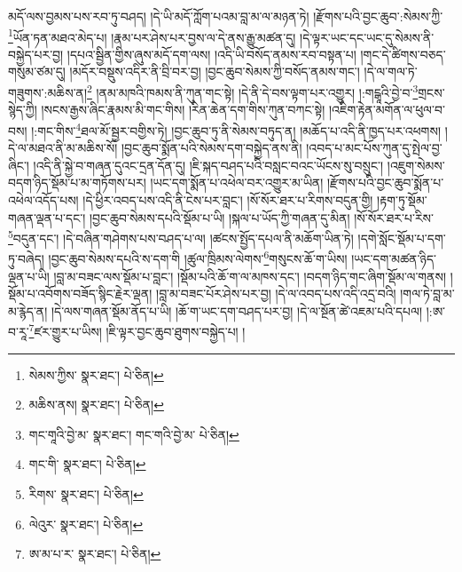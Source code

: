 མདོ་ལས་བྱམས་པས་རབ་ཏུ་བཤད། །དེ་ཡི་མདོ་ཀློག་པའམ་བླ་མ་ལ་མཉན་ཏེ། །རྫོགས་པའི་བྱང་ཆུབ་:སེམས་ཀྱི་\footnote{སེམས་ཀྱིས་  སྣར་ཐང་།  པེ་ཅིན། }ཡོན་ཏན་མཐའ་མེད་པ། །རྣམ་པར་ཤེས་པར་བྱས་ལ་དེ་ནས་རྒྱུ་མཚན་དུ། །དེ་ལྟར་ཡང་དང་ཡང་དུ་སེམས་ནི་བསྐྱེད་པར་བྱ། །དཔའ་སྦྱིན་གྱིས་ཞུས་མདོ་དག་ལས། །འདི་ཡི་བསོད་ནམས་རབ་བསྟན་པ། །གང་དེ་ཚིགས་བཅད་གསུམ་ཙམ་དུ། །མདོར་བསྡུས་འདིར་ནི་བྲི་བར་བྱ། །བྱང་ཆུབ་སེམས་ཀྱི་བསོད་ནམས་གང་། །དེ་ལ་གལ་ཏེ་གཟུགས་:མཆིས་ན།\footnote{མཆིས་ནས།  སྣར་ཐང་།  པེ་ཅིན། } །ནམ་མཁའི་ཁམས་ནི་ཀུན་གང་སྟེ། །དེ་ནི་དེ་བས་ལྟག་པར་འགྱུར། །:གངྒཱའི་བྱེ་བ་\footnote{གང་གཱའི་བྱེ་མ་  སྣར་ཐང་། གང་གའི་བྱེ་མ་  པེ་ཅིན། }གྲངས་སྙེད་ཀྱི། །སངས་རྒྱས་ཞིང་རྣམས་མི་གང་གིས། །རིན་ཆེན་དག་གིས་ཀུན་བཀང་སྟེ། །འཇིག་རྟེན་མགོན་ལ་ཕུལ་བ་བས། །:གང་གིས་\footnote{གང་གི་  སྣར་ཐང་།  པེ་ཅིན། }ཐལ་མོ་སྦྱར་བགྱིས་ཏེ། །བྱང་ཆུབ་ཏུ་ནི་སེམས་བཏུད་ན། །མཆོད་པ་འདི་ནི་ཁྱད་པར་འཕགས། །དེ་ལ་མཐའ་ནི་མ་མཆིས་སོ། །བྱང་ཆུབ་སྨོན་པའི་སེམས་དག་བསྐྱེད་ནས་ནི། །འབད་པ་མང་པོས་ཀུན་དུ་སྤེལ་བྱ་ཞིང་། །འདི་ནི་སྐྱེ་བ་གཞན་དུའང་དྲན་དོན་དུ། །ཇི་སྐད་བཤད་པའི་བསླང་བའང་ཡོངས་སུ་བསྲུང་། །འཇུག་སེམས་བདག་ཉིད་སྡོམ་པ་མ་གཏོགས་པར། །ཡང་དག་སྨོན་པ་འཕེལ་བར་འགྱུར་མ་ཡིན། །རྫོགས་པའི་བྱང་ཆུབ་སྨོན་པ་འཕེལ་འདོད་པས། །དེ་ཕྱིར་འབད་པས་འདི་ནི་ངེས་པར་བླང་། །སོ་སོར་ཐར་པ་རིགས་བདུན་གྱི། །རྟག་ཏུ་སྡོམ་གཞན་ལྡན་པ་དང་། །བྱང་ཆུབ་སེམས་དཔའི་སྡོམ་པ་ཡི། །སྐལ་པ་ཡོད་ཀྱི་གཞན་དུ་མིན། །སོ་སོར་ཐར་པ་རིས་\footnote{རིགས་  སྣར་ཐང་།  པེ་ཅིན། }བདུན་དང་། །དེ་བཞིན་གཤེགས་པས་བཤད་པ་ལ། །ཚངས་སྤྱོད་དཔལ་ནི་མཆོག་ཡིན་ཏེ། །དགེ་སློང་སྡོམ་པ་དག་ཏུ་བཞེད། །བྱང་ཆུབ་སེམས་དཔའི་ས་དག་གི །ཚུལ་ཁྲིམས་ལེགས་\footnote{ལེའུར་  སྣར་ཐང་།  པེ་ཅིན། }གསུངས་ཆོ་ག་ཡིས། །ཡང་དག་མཚན་ཉིད་ལྡན་པ་ཡི། །བླ་མ་བཟང་ལས་སྡོམ་པ་བླང་། །སྡོམ་པའི་ཆོ་ག་ལ་མཁས་དང་། །བདག་ཉིད་གང་ཞིག་སྡོམ་ལ་གནས། །སྡོམ་པ་འབོགས་བཟོད་སྙིང་རྗེར་ལྡན། །བླ་མ་བཟང་པོར་ཤེས་པར་བྱ། །དེ་ལ་འབད་པས་འདི་འདྲ་བའི། །གལ་ཏེ་བླ་མ་མ་རྙེད་ན། །དེ་ལས་གཞན་སྡོམ་ནོད་པ་ཡི། །ཆོ་ག་ཡང་དག་བཤད་པར་བྱ། །དེ་ལ་སྔོན་ཚེ་འཇམ་པའི་དཔལ། །:ཨ་བ་རཱ་\footnote{ཨ་མ་པ་ར་  སྣར་ཐང་།  པེ་ཅིན། }ཛར་གྱུར་པ་ཡིས། །ཇི་ལྟར་བྱང་ཆུབ་ཐུགས་བསྐྱེད་པ། །
